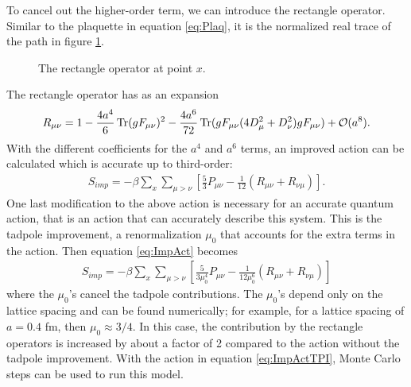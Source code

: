 \documentclass[11pt]{article}
\begin{document}
To cancel out the higher-order term, we can introduce the rectangle operator. Similar to the plaquette in equation \ref{eq:Plaq}, it is the normalized real trace of the path in figure \ref{fig:Rect}.
\begin{figure}[h]
\centering
{}
\caption{The rectangle operator at point $x$.} \label{fig:Rect}
\end{figure}
The rectangle operator has as an expansion
\begin{align}
	R_{\mu\nu}=1-\frac{4a^4}{6}\Trace(gF_{\mu\nu})^2-\frac{4a^6}{72}\Trace(gF_{\mu\nu}(4D_\mu^2+D_\nu^2)gF_{\mu\nu})+\mathcal{O}(a^8).
\end{align}
With the different coefficients for the $a^4$ and $a^6$ terms, an improved action can be calculated which is accurate up to third-order:
\begin{align}
	S_{imp}=-\beta\sum_x\sum_{\mu>\nu}\left[\frac{5}{3}P_{\mu\nu}-\frac{1}{12}(R_{\mu\nu}+R_{\nu\mu})\right].
	\label{eq:ImpAct}
\end{align}
One last modification to the above action is necessary for an accurate quantum action, that is an action that can accurately describe this system. This is the tadpole improvement, a renormalization $\mu_0$ that accounts for the extra terms in the action. Then equation \ref{eq:ImpAct} becomes
\begin{align}
	S_{imp}=-\beta\sum_x\sum_{\mu>\nu}\left[\frac{5}{3\mu_0^4}P_{\mu\nu}-\frac{1}{12\mu_0^6}(R_{\mu\nu}+R_{\nu\mu})\right]
	\label{eq:ImpActTPI}
\end{align}
where the $\mu_0$'s cancel the tadpole contributions. The $\mu_0$'s depend only on the lattice spacing and can be found numerically; for example, for a lattice spacing of $a=0.4$ fm, then $\mu_0\approx3/4$. In this case, the contribution by the rectangle operators is increased by about a factor of 2 compared to the action without the tadpole improvement. With the action in equation \ref{eq:ImpActTPI}, Monte Carlo steps can be used to run this model.
\end{document}

